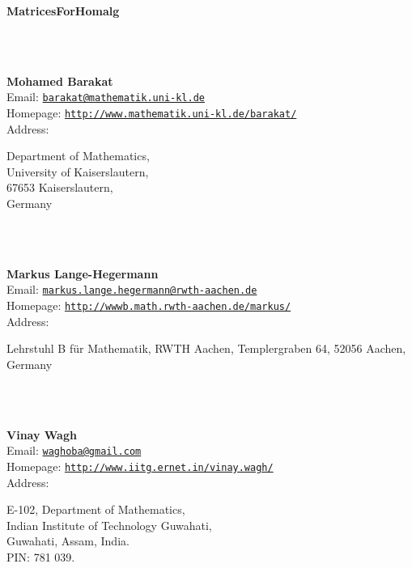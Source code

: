 \documentclass[a4paper,11pt]{report}
\newcommand{\maintitlesize}{\fontsize{50}{55}\selectfont}
\begin{document}
\begin{titlepage}
\begin{center}{\maintitlesize \textbf{\textsf{MatricesForHomalg}\mbox{}}}
\end{center}\vfill

\mbox{}\\
{\mbox{}\\
\small \noindent \textbf{Mohamed Barakat\\
    }  Email: \href{mailto://barakat@mathematik.uni-kl.de} {\texttt{barakat@mathematik.uni-kl.de}}\\
  Homepage: \href{http://www.mathematik.uni-kl.de/~barakat/} {\texttt{http://www.mathematik.uni-kl.de/\texttt{}barakat/}}\\
  Address: \begin{minipage}[t]{8cm}\noindent
 Department of Mathematics, \\
 University of Kaiserslautern, \\
 67653 Kaiserslautern, \\
 Germany \end{minipage}
}\\
{\mbox{}\\
\small \noindent \textbf{Markus Lange-Hegermann\\
    }  Email: \href{mailto://markus.lange.hegermann@rwth-aachen.de} {\texttt{markus.lange.hegermann@rwth-aachen.de}}\\
  Homepage: \href{http://wwwb.math.rwth-aachen.de/~markus/} {\texttt{http://wwwb.math.rwth-aachen.de/\texttt{}markus/}}\\
  Address: \begin{minipage}[t]{8cm}\noindent
 Lehrstuhl B f{\"u}r Mathematik, RWTH Aachen, Templergraben 64, 52056 Aachen,
Germany \end{minipage}
}\\
{\mbox{}\\
\small \noindent \textbf{Vinay Wagh\\
    }  Email: \href{mailto://waghoba@gmail.com} {\texttt{waghoba@gmail.com}}\\
  Homepage: \href{http://www.iitg.ernet.in/vinay.wagh/} {\texttt{http://www.iitg.ernet.in/vinay.wagh/}}\\
  Address: \begin{minipage}[t]{8cm}\noindent
 E-102, Department of Mathematics, \\
 Indian Institute of Technology Guwahati, \\
 Guwahati, Assam, India. \\
 PIN: 781 039. \end{minipage}
}\\
\end{titlepage}
\end{document}
